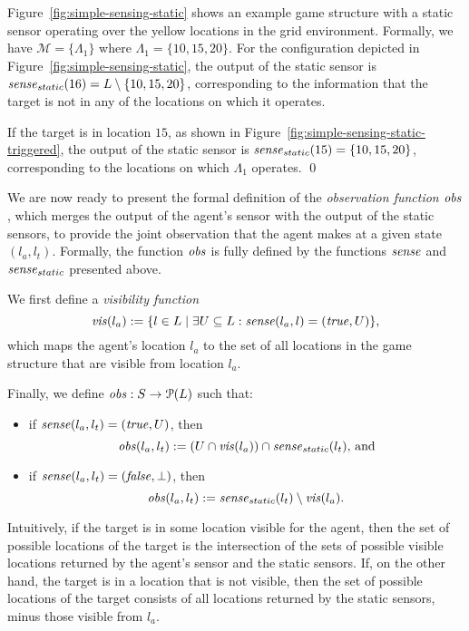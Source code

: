 \bigskip
\begin{eg}\label{ex:simple-surveillance-game-static-sensing}
Figure~\ref{fig:simple-sensing-static} shows an example game structure with a static sensor operating over the yellow locations in the grid environment. Formally, we have $\mathcal{M} = \{\Lambda_1\}$ where $\Lambda_1 = \{10,15,20\}$. 
For the configuration depicted in Figure~\ref{fig:simple-sensing-static}, the output of the static sensor is $\mathit{sense}_{static}(16) = L \setminus \{10,15,20\}$, corresponding to the information that the target is not in any of the locations on which it operates. 

If the target is in location $15$, as shown in Figure~\ref{fig:simple-sensing-static-triggered}, the output of the static sensor is $\mathit{sense}_{static}(15) = \{10,15,20\}$, corresponding to the locations on which $\Lambda_1$ operates. 
\qed
\end{eg}

We are now ready to present the formal definition of the \emph{observation function $\mathit{obs}$}, which merges the output of the agent's sensor with the output of the static sensors, to provide the joint observation that the agent makes at a given state $(l_a,l_t)$. Formally, the function $\mathit{obs}$ is fully defined by the functions $\mathit{sense}$ and $\mathit{sense}_{static}$ presented above.

We first define a \emph{visibility function} 
$$\mathit{vis}(l_a) := \{l \in L \mid \exists U \subseteq L: \mathit{sense}(l_a,l) = (\mathit{true},U)\},$$ which maps the agent's location $l_a$ to the set of all locations in the game structure that are visible from location $l_a$.

Finally, we define $\mathit{obs}: S \to \mathcal{P}(L)$ such that:
\begin{itemize}
    \item if $\mathit{sense}(l_a,l_t) =  (\mathit{true},U)$, then
 $$\mathit{obs}(l_a,l_t) :=  (U \cap \mathit{vis}(l_a) )\cap \mathit{sense}_{static} (l_t)\text{, and}$$
    \item if $\mathit{sense}(l_a,l_t) =  (\mathit{false},\bot)$, then
$$\mathit{obs}(l_a,l_t) := \mathit{sense}_{static}(l_t) \setminus \mathit{vis}(l_a).$$
\end{itemize}
Intuitively, if the target is in some location visible for the agent, then the set of possible locations of the target is the intersection of the sets of possible visible locations returned by the agent's sensor and the static sensors.
If, on the other hand, the target is in a location that is not visible, then the set of possible locations of the target consists of all locations returned by the static sensors, minus those visible from  $l_a$.


